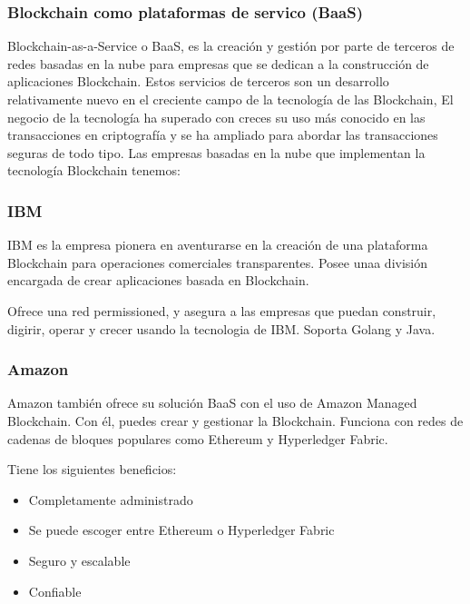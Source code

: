 \subsubsection{Blockchain como plataformas de servico (BaaS)}

Blockchain-as-a-Service o BaaS, es la creación y gestión por parte de terceros de redes basadas en la nube para 
empresas que se dedican a la construcción de aplicaciones Blockchain. Estos servicios de terceros son un desarrollo 
relativamente nuevo en el creciente campo de la tecnología de las Blockchain, El negocio de la tecnología ha superado 
con creces su uso más conocido en las transacciones en criptografía y se ha ampliado para abordar las transacciones 
seguras de todo tipo. Las empresas basadas en la nube que implementan la tecnología Blockchain tenemos:

\subsubsection*{IBM}

IBM es la empresa pionera en aventurarse en la creación de una plataforma Blockchain para operaciones comerciales
transparentes. Posee unaa división encargada de crear aplicaciones basada en Blockchain.

\vspace{5mm}

\noindent Ofrece una red permissioned, y asegura a las empresas que puedan construir, digirir, operar y crecer usando
la tecnologia de IBM. Soporta Golang y Java.

\subsubsection*{Amazon}

Amazon también ofrece su solución BaaS con el uso de Amazon Managed Blockchain. Con él, puedes crear y gestionar la 
Blockchain. Funciona con redes de cadenas de bloques populares como Ethereum y Hyperledger Fabric.

\vspace{5mm}

\noindent Tiene los siguientes beneficios:

\begin{itemize}
    \item Completamente administrado
    \item Se puede escoger entre Ethereum o Hyperledger Fabric
    \item Seguro y escalable
    \item Confiable
\end{itemize}


